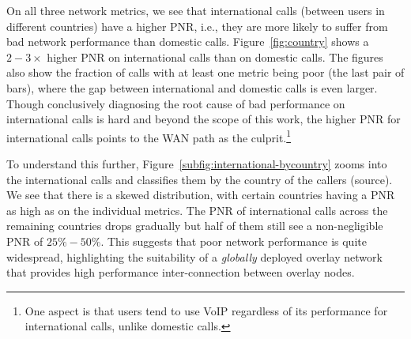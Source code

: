 On all three network metrics, we see that international 
calls (between users in different countries) have a
 higher PNR, i.e., they are more likely to suffer from 
 bad network performance than domestic calls. 
Figure~\ref{fig:country} shows a $2-3\times$ higher 
PNR on international calls than on domestic calls. 
The figures also show the fraction of calls with at least 
one metric being poor (the last pair of bars), where the 
gap between international and domestic calls is even 
larger. 
Though conclusively diagnosing the root cause of bad 
performance on international calls is hard and beyond 
the scope of this work, the higher PNR for international 
calls points to the WAN path as the culprit.\footnote{One 
aspect is that users tend to use VoIP 
regardless of its performance for international calls, 
unlike domestic calls.} %


To understand this further, 
Figure~\ref{subfig:international-bycountry} zooms into 
the international calls and classifies them by the country 
of the callers (source). 
We see that there is a skewed distribution, with certain 
countries having a PNR as high as on the individual metrics. 
The PNR of international calls across the remaining 
countries drops gradually but half of them still see a 
non-negligible PNR of $25\%-50\%$. 
This suggests that poor network performance is 
quite widespread, highlighting the suitability of a 
{\em globally} deployed overlay network that provides 
high performance inter-connection between overlay nodes.


